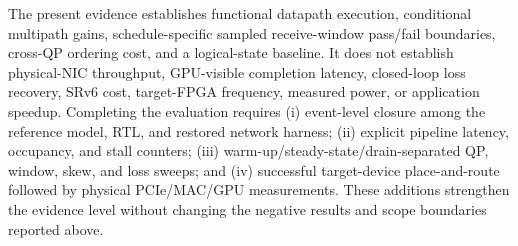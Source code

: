 The present evidence establishes functional datapath execution, conditional
multipath gains, schedule-specific sampled receive-window pass/fail boundaries,
cross-QP ordering cost, and a logical-state baseline.  It does not establish physical-NIC throughput,
GPU-visible completion latency, closed-loop loss recovery, SRv6 cost,
target-FPGA frequency, measured power, or application speedup.  Completing the
evaluation requires (i) event-level closure among the reference model, RTL, and
restored network harness; (ii) explicit pipeline latency, occupancy, and stall
counters; (iii) warm-up/steady-state/drain-separated QP, window, skew, and loss
sweeps; and (iv) successful target-device place-and-route followed by physical
PCIe/MAC/GPU measurements.  These additions strengthen the evidence level
without changing the negative results and scope boundaries reported above.
